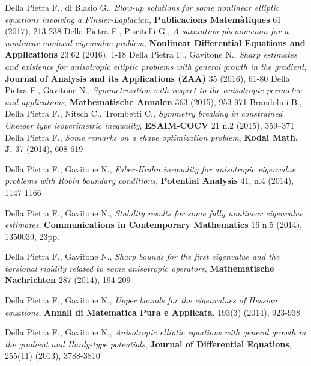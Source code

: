 \documentclass[11pt,a4paper,sans,colorlinks,linkcolor=green]{moderncv}
\begin{document}
 {Della Pietra F., di Blasio G., \textit{Blow-up solutions for some nonlinear elliptic equations involving a Finsler-Laplacian}, \textbf{Publicacions Matem\`atiques} 61 (2017),  213-238}
 {Della Pietra F., Piscitelli G., \textit{A saturation phenomenon
for a nonlinear nonlocal eigenvalue problem}, \textbf{Nonlinear Differential Equations and Applications} 23:62 (2016), 1-18}
 {Della Pietra F., Gavitone N., \textit{Sharp estimates and
    existence for anisotropic elliptic problems with general growth in the gradient}, \textbf{Journal of Analysis and its Applications (ZAA)} 35 (2016), 61-80}
  {Della Pietra F., Gavitone N., \textit{Symmetrization with respect to the anisotropic perimeter and applications}, \textbf{Mathematische Annalen} 363 (2015), 953-971}
   {Brandolini B., Della Pietra F., Nitsch C., Trombetti C., \textit{Symmetry breaking in constrained Cheeger type isoperimetric
    inequality}, \textbf{ESAIM-COCV} 21 n.2 (2015), 359--371}
  {Della Pietra F., \textit{Some remarks on a shape optimization problem},
\textbf{Kodai Math. J.} 37 (2014), 608-619}

 {Della Pietra F., Gavitone N., \textit{Faber-Krahn
    inequality for anisotropic eigenvalue problems with Robin boundary
    conditions}, \textbf{Potential Analysis} 41, n.4 (2014), 1147-1166}
\thispagestyle{empty}

 {Della Pietra F., Gavitone N., \textit{Stability results for some fully nonlinear eigenvalue estimates}, \textbf{Communications in Contemporary Mathematics} 16 n.5 (2014), 1350039, 23pp.}

 {Della Pietra F., Gavitone N., \textit{Sharp bounds for the first eigenvalue and the torsional rigidity related to some
    anisotropic operators}, \textbf{Mathematische Nachrichten}
     287 (2014), 194-209}

 {Della Pietra F., Gavitone N., \textit{Upper bounds
    for the eigenvalues of Hessian equations},
    \textbf{Annali di Matematica Pura e Applicata},
    193(3) (2014), 923-938}

 {Della Pietra F., Gavitone N., \textit{Anisotropic  elliptic equations with general growth in the gradient and Hardy-type potentials},
    \textbf{Journal of Differential Equations}, 255(11) (2013), 3788-3810}
\end{document}
